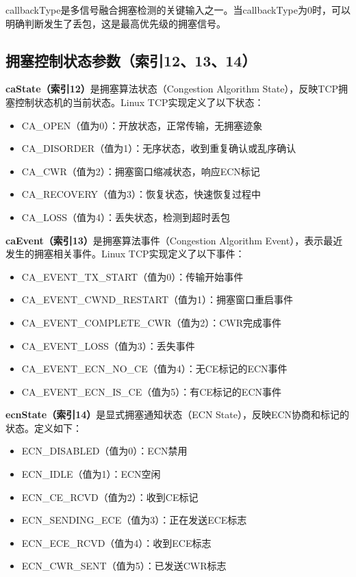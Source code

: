 callbackType是多信号融合拥塞检测的关键输入之一。当callbackType为0时，可以明确判断发生了丢包，这是最高优先级的拥塞信号。

\subsection{拥塞控制状态参数（索引12、13、14）}

\textbf{caState（索引12）}是拥塞算法状态（Congestion Algorithm State），反映TCP拥塞控制状态机的当前状态。Linux TCP实现定义了以下状态：

\begin{itemize}
    \item CA\_OPEN（值为0）：开放状态，正常传输，无拥塞迹象
    \item CA\_DISORDER（值为1）：无序状态，收到重复确认或乱序确认
    \item CA\_CWR（值为2）：拥塞窗口缩减状态，响应ECN标记
    \item CA\_RECOVERY（值为3）：恢复状态，快速恢复过程中
    \item CA\_LOSS（值为4）：丢失状态，检测到超时丢包
\end{itemize}

\textbf{caEvent（索引13）}是拥塞算法事件（Congestion Algorithm Event），表示最近发生的拥塞相关事件。Linux TCP实现定义了以下事件：

\begin{itemize}
    \item CA\_EVENT\_TX\_START（值为0）：传输开始事件
    \item CA\_EVENT\_CWND\_RESTART（值为1）：拥塞窗口重启事件
    \item CA\_EVENT\_COMPLETE\_CWR（值为2）：CWR完成事件
    \item CA\_EVENT\_LOSS（值为3）：丢失事件
    \item CA\_EVENT\_ECN\_NO\_CE（值为4）：无CE标记的ECN事件
    \item CA\_EVENT\_ECN\_IS\_CE（值为5）：有CE标记的ECN事件
\end{itemize}

\textbf{ecnState（索引14）}是显式拥塞通知状态（ECN State），反映ECN协商和标记的状态。定义如下：

\begin{itemize}
    \item ECN\_DISABLED（值为0）：ECN禁用
    \item ECN\_IDLE（值为1）：ECN空闲
    \item ECN\_CE\_RCVD（值为2）：收到CE标记
    \item ECN\_SENDING\_ECE（值为3）：正在发送ECE标志
    \item ECN\_ECE\_RCVD（值为4）：收到ECE标志
    \item ECN\_CWR\_SENT（值为5）：已发送CWR标志
\end{itemize}

